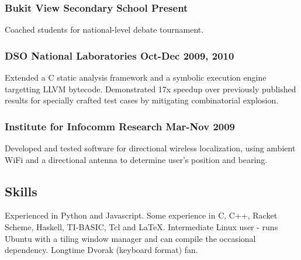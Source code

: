 \documentclass[letterpaper]{article}
\begin{document}
\subsubsection*{Bukit View Secondary School \hfill Present}
Coached students for national-level debate tournament.

\subsubsection*{DSO National Laboratories \hfill Oct-Dec 2009, 2010}
Extended a C static analysis framework and a symbolic execution engine targetting LLVM bytecode. Demonstrated 17x speedup over previously published results for specially crafted test cases by mitigating combinatorial explosion.

\subsubsection*{Institute for Infocomm Research \hfill Mar-Nov 2009}
Developed and tested software for directional wireless localization, using ambient WiFi and a directional antenna to determine user's position and bearing.

\vspace{1em}

\begin{center}
\section*{Skills}
\end{center}
Experienced in Python and Javascript. Some experience in C, C++, Racket Scheme, Haskell, TI-BASIC, Tcl and LaTeX. Intermediate Linux user - runs Ubuntu with a tiling window manager and can compile the occasional dependency. Longtime Dvorak (keyboard format) fan.
\end{document}
